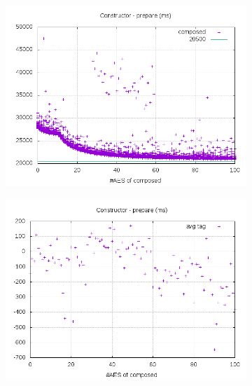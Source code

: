 \documentclass[10pt,a4paper]{article}
\begin{document}
\begin{figure}[h]
    \centering
    \begin{subfigure}[t]{0.3\textwidth}
        \includegraphics[width=\textwidth]{const_prepare_plots}
        \caption{}
        \label{data const prepare composed}
    \end{subfigure}
    \begin{subfigure}[t]{0.3\textwidth}
        \includegraphics[width=\textwidth]{const_prepare_avg}
        \caption{}
        \label{data const prepare tag}
    \end{subfigure}
    \begin{subfigure}[t]{0.3\textwidth}

\end{subfigure}
\end{figure}
\end{document}
